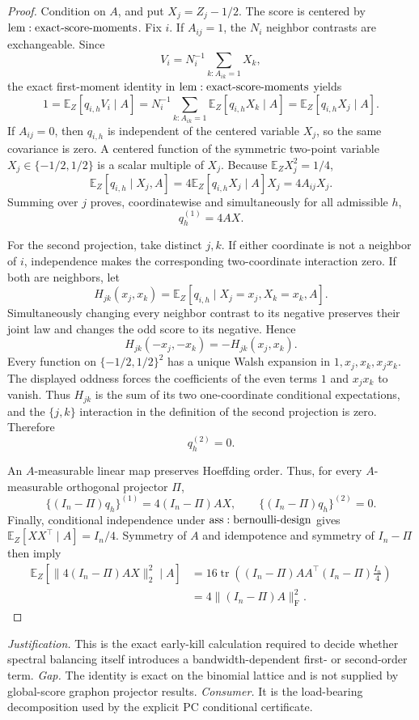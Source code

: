 \documentclass{article}
\begin{document}
\begin{proof}
Condition on \(A\), and put \(X_j=Z_j-1/2\).  The score is centered by \({\rm lem:exact\text{-}score\text{-}moments}\).  Fix \(i\).  If \(A_{ij}=1\), the \(N_i\) neighbor contrasts are exchangeable.  Since
\[
 V_i=N_i^{-1}\sum_{k:A_{ik}=1}X_k,
\]
the exact first-moment identity in \({\rm lem:exact\text{-}score\text{-}moments}\) yields
\[
 1=\mathbb E_Z[q_{i,h}V_i\mid A]
 =N_i^{-1}\sum_{k:A_{ik}=1}\mathbb E_Z[q_{i,h}X_k\mid A]
 =\mathbb E_Z[q_{i,h}X_j\mid A].
\]
If \(A_{ij}=0\), then \(q_{i,h}\) is independent of the centered variable \(X_j\), so the same covariance is zero.  A centered function of the symmetric two-point variable \(X_j\in\{-1/2,1/2\}\) is a scalar multiple of \(X_j\).  Because \(\mathbb E_ZX_j^2=1/4\),
\[
 \mathbb E_Z[q_{i,h}\mid X_j,A]
 =4\mathbb E_Z[q_{i,h}X_j\mid A]X_j=4A_{ij}X_j.
\]
Summing over \(j\) proves, coordinatewise and simultaneously for all admissible \(h\),
\[
 q_h^{(1)}=4AX.
\]

For the second projection, take distinct \(j,k\).  If either coordinate is not a neighbor of \(i\), independence makes the corresponding two-coordinate interaction zero.  If both are neighbors, let
\[
 H_{jk}(x_j,x_k)=\mathbb E_Z[q_{i,h}\mid X_j=x_j,X_k=x_k,A].
\]
Simultaneously changing every neighbor contrast to its negative preserves their joint law and changes the odd score to its negative.  Hence
\[
 H_{jk}(-x_j,-x_k)=-H_{jk}(x_j,x_k).
\]
Every function on \(\{-1/2,1/2\}^2\) has a unique Walsh expansion in \(1,x_j,x_k,x_jx_k\).  The displayed oddness forces the coefficients of the even terms \(1\) and \(x_jx_k\) to vanish.  Thus \(H_{jk}\) is the sum of its two one-coordinate conditional expectations, and the \(\{j,k\}\) interaction in the definition of the second projection is zero.  Therefore
\[
 q_h^{(2)}=0.
\]

An \(A\)-measurable linear map preserves Hoeffding order.  Thus, for every \(A\)-measurable orthogonal projector \(\Pi\),
\[
 \{(I_n-\Pi)q_h\}^{(1)}=4(I_n-\Pi)AX,
 \qquad \{(I_n-\Pi)q_h\}^{(2)}=0.
\]
Finally, conditional independence under \({\rm ass:bernoulli\text{-}design}\) gives \(\mathbb E_Z[XX^\top\mid A]=I_n/4\).  Symmetry of \(A\) and idempotence and symmetry of \(I_n-\Pi\) then imply
\[
\begin{aligned}
 \mathbb E_Z\!\left[\|4(I_n-\Pi)AX\|_2^2\mid A\right]
 &=16\operatorname{tr}\!\left((I_n-\Pi)AA^\top(I_n-\Pi)\frac{I_n}{4}\right)\\
 &=4\|(I_n-\Pi)A\|_{\mathrm F}^2.
\end{aligned}
\]
\end{proof}
\par\smallskip\noindent \textit{Justification.} This is the exact early-kill calculation required to decide whether spectral balancing itself introduces a bandwidth-dependent first- or second-order term. \textit{Gap.} The identity is exact on the binomial lattice and is not supplied by global-score graphon projector results. \textit{Consumer.} It is the load-bearing decomposition used by the explicit PC conditional certificate.
\end{document}
